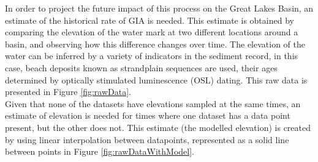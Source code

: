 \documentclass{article}
\begin{document}
 In order to project the future impact of this process on the Great Lakes Basin,
 an estimate of the historical rate of GIA is needed. This estimate is obtained by
 comparing the elevation of the water mark at two different locations around a basin, and
 observing how this difference changes over time. The elevation of the water can be inferred
 by a variety of indicators in the sediment record, in this case, beach deposits known
 as strandplain sequences are used, their ages determined by optically stimulated
 luminescence (OSL) dating. This raw data is presented in Figure \ref{fig:rawData}.\\

 
 Given that none of the datasets have elevations sampled
 at the same times, an estimate of elevation is needed for times where one dataset
 has a data point present, but the other does not. This estimate 
 (the modelled elevation) is created by using linear interpolation between datapoints,
 represented as a solid line between points in Figure \ref{fig:rawDataWithModel}.\\

 
 
 
 

\end{document}
